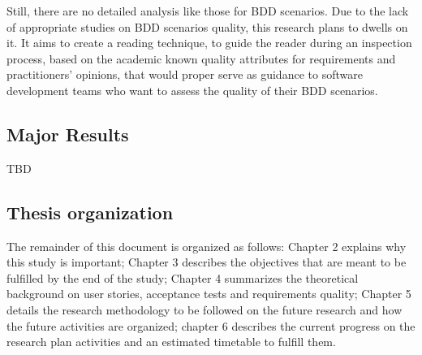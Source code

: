 Still, there are no detailed analysis like those for BDD scenarios. Due to the lack of appropriate studies on BDD scenarios quality, this research plans to dwells on it. It aims to create a reading technique, to guide the reader during an inspection process, based on the academic known quality attributes for requirements and practitioners' opinions, that would proper serve as guidance to software development teams who want to assess the quality of their BDD scenarios.

\subsection{Major Results}

TBD

\subsection{Thesis organization}

The remainder of this document is organized as follows: Chapter 2 explains why this study is important; Chapter 3 describes the objectives that are meant to be fulfilled by the end of the study; Chapter 4 summarizes the theoretical background on user stories, acceptance tests and requirements quality; Chapter 5 details the research methodology to be followed on the future research and how the future activities are organized; chapter 6 describes the current progress on the research plan activities and an estimated timetable to fulfill them.